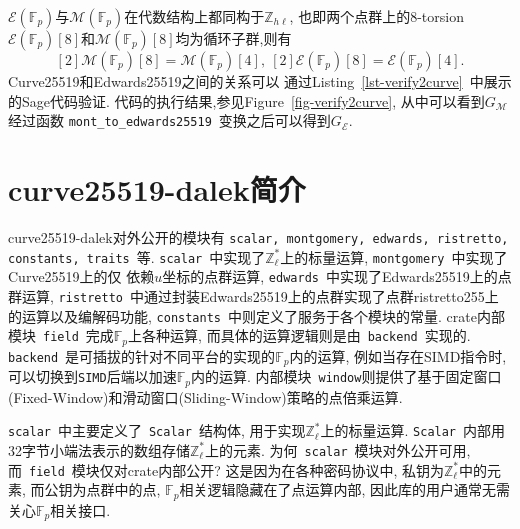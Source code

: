 \documentclass{article}
\newcommand{\Z}{\mathbb{Z}}
\newcommand{\F}{\mathbb{F}}
\newcommand{\code}[1]{\lstinline!#1!}
\begin{document}
$\mathcal{E}(\F_p)$与$\mathcal{M}(\F_p)$在代数结构上都同构于$\Z_{h\ell}$,
也即两个点群上的8-torsion $\mathcal{E}(\F_p)[8]$和$\mathcal{M}(\F_p)[8]$均为循环子群,则有
$$
[2]\mathcal{M}(\F_p)[8] =\mathcal{M}(\F_p)[4] ,\ [2]\mathcal{E}(\F_p)[8] = \mathcal{E}(\F_p)[4].
$$
Curve25519和Edwards25519之间的关系可以
通过Listing~\ref{lst-verify2curve}~中展示的Sage代码验证.
代码的执行结果,参见Figure~\ref{fig-verify2curve}, 从中可以看到$G_{\mathcal{M}}$经过函数
\code{mont_to_edwards25519}~变换之后可以得到$G_{\mathcal{E}}$.

\section{\textsf{curve25519-dalek}简介}

\textsf{curve25519-dalek}对外公开的模块有
\code{scalar, montgomery, edwards, ristretto, constants, traits}~等.
\code{scalar}~中实现了$\Z_\ell^*$上的标量运算, \code{montgomery}~中实现了Curve25519上的仅
依赖$u$坐标的点群运算, \code{edwards}~中实现了Edwards25519上的点群运算, 
\code{ristretto}~中通过封装Edwards25519上的点群实现了点群\textsf{ristretto255}上的运算以及编解码功能,
\code{constants}~中则定义了服务于各个模块的常量.
crate内部模块~\code{field}~完成$\F_p$上各种运算, 而具体的运算逻辑则是由~\code{backend}~实现的.
\code{backend}~是可插拔的针对不同平台的实现的$\F_p$内的运算, 例如当存在SIMD指令时,
可以切换到\code{SIMD}后端以加速$\F_p$内的运算. 
内部模块~\code{window}则提供了基于固定窗口(Fixed-Window)和滑动窗口(Sliding-Window)策略的点倍乘运算.

\code{scalar}~中主要定义了~\code{Scalar}~结构体, 用于实现$\Z_\ell^*$上的标量运算.
\code{Scalar}~内部用32字节小端法表示的数组存储$\Z_\ell^*$上的元素. 
为何~\code{scalar}~模块对外公开可用,而~\code{field}~模块仅对crate内部公开?
这是因为在各种密码协议中, 私钥为$\Z_\ell^*$中的元素, 
而公钥为点群中的点, $\F_p$相关逻辑隐藏在了点运算内部, 因此库的用户通常无需关心$\F_p$相关接口.
\end{document}
